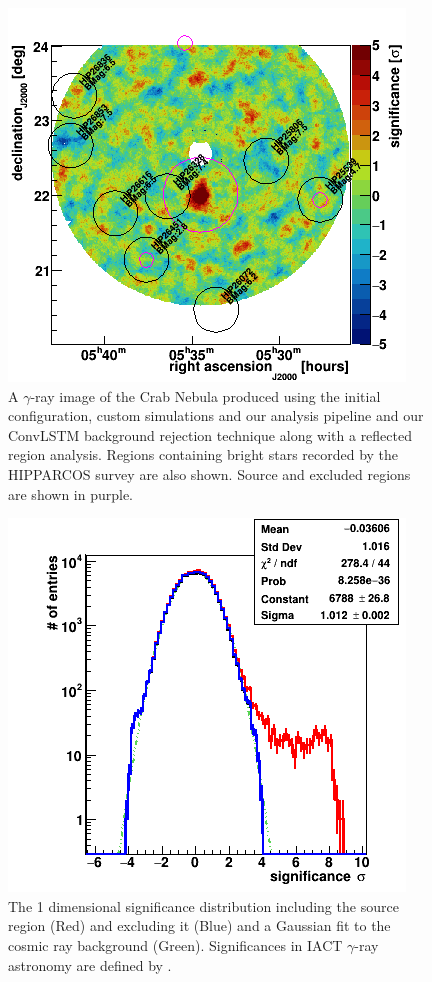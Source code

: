 \begin{figure}[h] 
        \centering \includegraphics[width=\columnwidth]{figures/skysig.png}

        \caption{
                \label{fig:skysig} A $\gamma$-ray image of the Crab Nebula produced using the initial configuration, custom simulations and our analysis pipeline and our ConvLSTM background rejection technique along with a reflected region analysis. Regions containing bright stars recorded by the HIPPARCOS survey are also shown. Source and excluded regions are shown in purple.
        }
\end{figure}
\begin{figure}[h] 
        \centering \includegraphics[width=0.5\columnwidth]{figures/sig1d.png}

        \caption{
                \label{fig:sig1D} The 1 dimensional significance distribution including the source region (Red) and excluding it (Blue) and a Gaussian fit to the cosmic ray background (Green). Significances in IACT $\gamma$-ray astronomy are defined by \cite{LiMa}.
        }
\end{figure}
